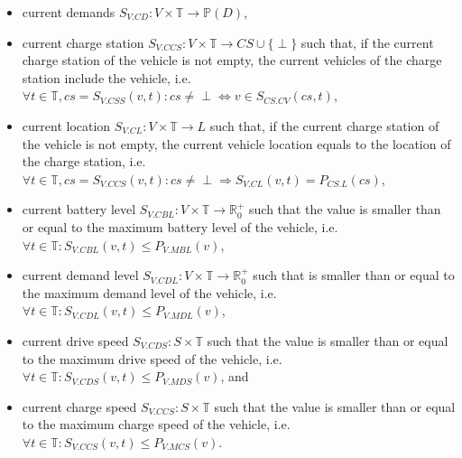 \documentclass{article}
\begin{document}
    \begin{itemize}
        \item current demands $S_{V.CD}: V \times \mathbb{T} \rightarrow \mathbb{P}(D)$,
        \item current charge station $S_{V.CCS}: V \times \mathbb{T} \rightarrow CS \cup \{\perp\}$ such that, if the current charge station of the vehicle is not empty, the current vehicles of the charge station include the vehicle, i.e.\ $\forall t \in \mathbb{T}, cs = S_{V.CSS}(v,t): cs \neq \perp \Leftrightarrow v \in S_{CS.CV}(cs,t)$,
        \item current location $S_{V.CL}: V \times \mathbb{T} \rightarrow L$ such that, if the current charge station of the vehicle is not empty, the current vehicle location equals to the location of the charge station, i.e.\ $\forall t \in \mathbb{T}, cs = S_{V.CCS}(v,t): cs \neq \perp \Rightarrow S_{V.CL}(v,t)=P_{CS.L}(cs)$,
        \item current battery level $S_{V.CBL}: V \times \mathbb{T} \rightarrow \mathbb{R}_0^+$ such that the value is smaller than or equal to the maximum battery level of the vehicle, i.e.\ $\forall t \in \mathbb{T}: S_{V.CBL}(v,t) \leq P_{V.MBL}(v)$,
        \item current demand level $S_{V.CDL}: V \times \mathbb{T} \rightarrow \mathbb{R}_0^+$ such that is smaller than or equal to the maximum demand level of the vehicle, i.e.\ $\forall t \in \mathbb{T}: S_{V.CDL}(v,t) \leq P_{V.MDL}(v)$,
        \item current drive speed $S_{V.CDS}: S \times \mathbb{T}$ such that the value is smaller than or equal to the maximum drive speed of the vehicle, i.e.\ $\forall t \in \mathbb{T}: S_{V.CDS}(v,t) \leq P_{V.MDS}(v)$, and
        \item current charge speed $S_{V.CCS}: S \times \mathbb{T}$ such that the value is smaller than or equal to the maximum charge speed of the vehicle, i.e.\ $\forall t \in \mathbb{T}: S_{V.CCS}(v,t) \leq P_{V.MCS}(v)$.
    \end{itemize}
\end{document}
